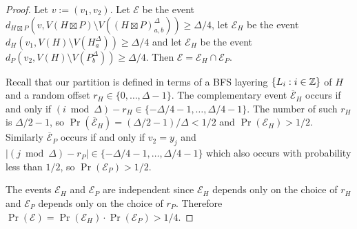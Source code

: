 \documentclass{patmorin}
\renewcommand{\ge}{\geqslant}
\begin{document}
\begin{proof}
  Let $v:=(v_1,v_2)$.
  Let $\mathcal{E}$ be the event $d_{H\boxtimes P}(v, V(H\boxtimes P)\setminus V((H\boxtimes P)_{a,b}^\Delta)) \ge \Delta/4$, let $\mathcal{E}_H$ be the event $d_{H}(v_1, V(H)\setminus V(H^\Delta_a))\ge\Delta/4$ and let $\mathcal{E}_H$ be the event $d_{P}(v_2, V(H)\setminus V(P^\Delta_b))\ge\Delta/4$.  Then $\mathcal{E}=\mathcal{E}_H\cap\mathcal{E}_P$.

  Recall that our partition is defined in terms of a BFS layering $\{L_i:i\in\mathbb{Z}\}$ of $H$ and a random offset $r_H\in\{0,\ldots,\Delta-1\}$.
  The complementary event $\overline{\mathcal{E}}_H$ occurs if and only if $(i\bmod\Delta)-r_H\in\{-\Delta/4-1,\ldots,\Delta/4-1\}$. The number of such $r_H$ is $\Delta/2-1$, so $\Pr(\overline{\mathcal{E}}_H)=(\Delta/2-1)/\Delta < 1/2$ and $\Pr(\mathcal{E}_H)>1/2$.  Similarly $\overline{\mathcal{E}}_P$ occurs if and only if $v_2=y_j$ and $|(j\bmod\Delta)-r_P|\in\{-\Delta/4-1,\ldots,\Delta/4-1\}$ which also occurs with probability less than $1/2$, so $\Pr(\mathcal{E}_P)> 1/2$.

  The events $\mathcal{E}_H$ and $\mathcal{E}_P$ are independent since $\mathcal{E}_H$ depends only on the choice of $r_H$ and $\mathcal{E}_P$ depends only on the choice of $r_P$.
  Therefore $\Pr(\mathcal{E})=\Pr(\mathcal{E}_H)\cdot\Pr(\mathcal{E}_P) > 1/4$.
\end{proof}
\end{document}
